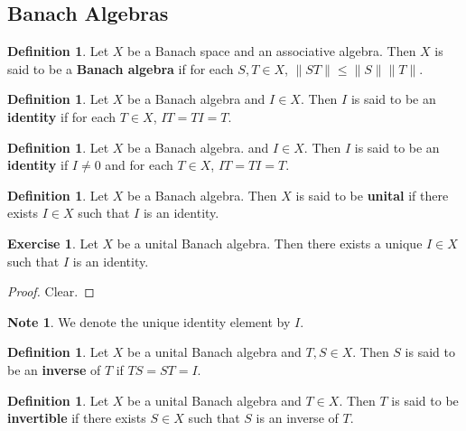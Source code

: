 \documentclass[12pt]{amsart}
\theoremstyle{definition}
\newtheorem{defn}[definition]{Definition}
\newtheorem{note}[definition]{Note}
\newtheorem{ex}[definition]{Exercise}
\newcommand{\tbf}[1]{\textbf{#1}}
\DeclareMathOperator*{\0}{\mbf{0}}
\DeclareMathOperator*{\1}{\mbf{1}}
\newcommand{\lex}[1]{\label{ex:#1}}
\newcommand{\ld}[1]{\label{defn:#1}}
\begin{document}
\newpage
	\subsection{Banach Algebras}
	
	\begin{defn} \ld{}
		Let $X$ be a Banach space and an associative algebra. Then $X$ is said to be a \tbf{Banach algebra} if for each $S,T \in X$, $\|ST \|\leq \|S \|\|T \|$. 
	\end{defn}
	
	\begin{defn} \ld{}
	Let $X$ be a Banach algebra and $I \in X$. Then $I$ is said to be an \tbf{identity} if for each $T \in X$, $IT = TI = T$. 
	\end{defn}
	
	\begin{defn} \ld{}
	Let $X$ be a Banach algebra. and $I \in X$. Then $I$ is said to be an \tbf{identity} if $I \neq 0$ and for each $T \in X$, $IT = TI = T$.
	\end{defn}
	
	\begin{defn} \ld{}
	Let $X$ be a Banach algebra. Then $X$ is said to be \tbf{unital} if there exists $I \in X$ such that $I$ is an identity.
	\end{defn}	
		
		\begin{ex} \lex{}
		Let $X$ be a unital Banach algebra. Then there exists a unique $I \in X$ such that $I$ is an identity.
		\end{ex} 
		
		\begin{proof}
		Clear.
		\end{proof}
		
		\begin{note}
		We denote the unique identity element by $I$.
		\end{note}
		
		\begin{defn} \ld{}
		Let $X$ be a unital Banach algebra and $T,S \in X$. Then $S$ is said to be an 
		\tbf{inverse} of $T$ if $TS=ST = I$.
		\end{defn}

		\begin{defn} \ld{}
		Let $X$ be a unital Banach algebra and $T \in X$. 			Then $T$ is said to be 
		\tbf{invertible} if there exists $S \in X$ such 		that $S$ is an inverse of $T$.
		\end{defn}
		
\end{document}
